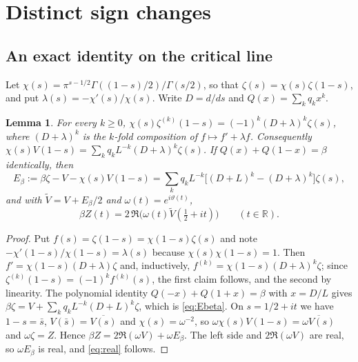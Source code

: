 \documentclass[11pt]{article}
\newtheorem{lemma}[theorem]{Lemma}
\theoremstyle{remark}
\newcommand{\R}{\mathbb R}
\newcommand{\Vt}{\widetilde V}
\begin{document}
\section{Distinct sign changes}\label{sec:signs}

\subsection{An exact identity on the critical line}

Let $\chi(s)=\pi^{s-1/2}\Gamma((1-s)/2)/\Gamma(s/2)$, so that
$\zeta(s)=\chi(s)\zeta(1-s)$, and put $\lambda(s)=-\chi'(s)/\chi(s)$. Write
$D=d/ds$ and $Q(x)=\sum_kq_kx^k$.

\begin{lemma}\label{lem:identity}
For every $k\ge0$, $\chi(s)\zeta^{(k)}(1-s)=(-1)^k(D+\lambda)^k\zeta(s)$, where
$(D+\lambda)^k$ is the $k$-fold composition of $f\mapsto f'+\lambda f$.
Consequently $\chi(s)V(1-s)=\sum_kq_kL^{-k}(D+\lambda)^k\zeta(s)$. If
$Q(x)+Q(1-x)=\beta$ identically, then
\begin{equation}\label{eq:Ebeta}
 E_\beta:=\beta\zeta-V-\chi(s)V(1-s)=\sum_kq_kL^{-k}
 \bigl[(D+L)^k-(D+\lambda)^k\bigr]\zeta(s),
\end{equation}
and with $\Vt=V+E_\beta/2$ and $\omega(t)=e^{i\vartheta(t)}$,
\begin{equation}\label{eq:real}
 \beta Z(t)=2\,\Re\bigl(\omega(t)\Vt(\tfrac12+it)\bigr)\qquad(t\in\R).
\end{equation}
\end{lemma}

\begin{proof}
Put $f(s)=\zeta(1-s)=\chi(1-s)\zeta(s)$ and note $-\chi'(1-s)/\chi(1-s)=
\lambda(s)$ because $\chi(s)\chi(1-s)=1$. Then $f'=\chi(1-s)(D+\lambda)\zeta$ and,
inductively, $f^{(k)}=\chi(1-s)(D+\lambda)^k\zeta$; since
$\zeta^{(k)}(1-s)=(-1)^kf^{(k)}(s)$, the first claim follows, and the second by
linearity. The polynomial identity $Q(-x)+Q(1+x)=\beta$ with $x=D/L$ gives
$\beta\zeta=V+\sum_kq_kL^{-k}(D+L)^k\zeta$, which is \eqref{eq:Ebeta}. On
$s=1/2+it$ we have $1-s=\bar s$, $V(\bar s)=\overline{V(s)}$ and
$\chi(s)=\omega^{-2}$, so $\omega\chi(s)V(1-s)=\overline{\omega V(s)}$ and
$\omega\zeta=Z$. Hence $\beta Z=2\Re(\omega V)+\omega E_\beta$. The left side
and $2\Re(\omega V)$ are real, so $\omega E_\beta$ is real, and
\eqref{eq:real} follows.
\end{proof}
\end{document}
